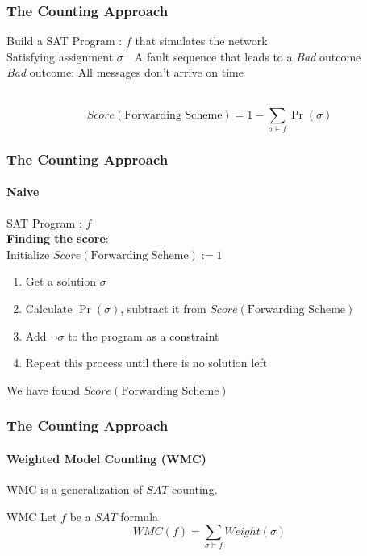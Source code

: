 \documentclass{beamer}
\begin{document}
\begin{frame}
\frametitle{The Counting Approach}
	Build a SAT Program : $ f $ that simulates the network\\[2ex]
	Satisfying assignment $\sigma$\ \leftrightarrow\ A fault sequence that leads to a \textit{Bad} outcome\\
	\textit{Bad} outcome: All messages don't arrive on time\\[3ex]
	\pause
	\begin{block}{$\ $}
	$$ Score(\text{Forwarding Scheme}) = 1-\sum_{\sigma \vDash f}\Pr(\sigma) $$
	\end{block}
\end{frame}

\begin{frame}
\frametitle{The Counting Approach}
\framesubtitle{Naive}

	SAT Program : $ f $ \\[3ex]
	\textbf{Finding the score}:\\
	Initialize $Score(\text{Forwarding Scheme}):=1$
	\begin{enumerate}
		\item Get a solution $\sigma$
		\item Calculate $\Pr(\sigma)$, subtract it from $Score(\text{Forwarding Scheme})$
		\item Add $\neg \sigma$ to the program as a constraint
		\item Repeat this process until there is no solution left\\[3ex]
	\end{enumerate}
	We have found $Score(\text{Forwarding Scheme})$
\end{frame}

\begin{frame}
\frametitle{The Counting Approach} %
\framesubtitle{Weighted Model Counting (WMC)}

	WMC is a generalization of $SAT$ counting.\\
	\begin{block}{WMC}
	Let $f$ be a $SAT$ formula
		$$WMC(f) = \sum_{\sigma \vDash f}Weight(\sigma)$$
	\end{block}
\end{frame}
\end{document}
